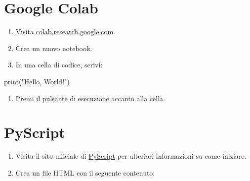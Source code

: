 \documentclass[
  letterpaper,
]{scrbook}
\newenvironment{Shaded}{\begin{snugshade}}{\end{snugshade}}
\newcommand{\BuiltInTok}[1]{\textcolor[rgb]{0.00,0.23,0.31}{#1}}
\newcommand{\NormalTok}[1]{\textcolor[rgb]{0.00,0.23,0.31}{#1}}
\newcommand{\StringTok}[1]{\textcolor[rgb]{0.13,0.47,0.30}{#1}}
\providecommand{\tightlist}{%
  \setlength{\itemsep}{0pt}\setlength{\parskip}{0pt}}\usepackage{longtable,booktabs,array}
\begin{document}
\section{Google Colab}

\begin{enumerate}
\def\labelenumi{\arabic{enumi}.}
\tightlist
\item
  Visita
  \href{https://colab.research.google.com/}{colab.research.google.com}.
\item
  Crea un nuovo notebook.
\item
  In una cella di codice, scrivi:
\end{enumerate}

\begin{Shaded}
\begin{Highlighting}[]
\BuiltInTok{print}\NormalTok{(}\StringTok{"Hello, World!"}\NormalTok{)}
\end{Highlighting}
\end{Shaded}

\begin{enumerate}
\def\labelenumi{\arabic{enumi}.}
\setcounter{enumi}{3}
\tightlist
\item
  Premi il pulsante di esecuzione accanto alla cella.
\end{enumerate}

\section{PyScript}

\begin{enumerate}
\def\labelenumi{\arabic{enumi}.}
\tightlist
\item
  Visita il sito ufficiale di \href{https://pyscript.net/}{PyScript} per
  ulteriori informazioni su come iniziare.
\item
  Crea un file HTML con il seguente contenuto:
\end{enumerate}
\end{document}
